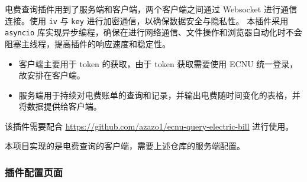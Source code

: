 \documentclass[14pt,a4paper,UTF8,twoside]{article}
\begin{document}
电费查询插件用到了服务端和客户端，两个客户端之间通过 Websocket 进行通信连接。使用 \verb`iv` 与 \verb`key` 进行加密通信，以确保数据安全与隐私性。
本插件采用 \texttt{asyncio} 库实现异步编程，确保在进行网络通信、文件操作和浏览器自动化时不会阻塞主线程，提高插件的响应速度和稳定性。

\begin{itemize}
    \item 客户端主要用于 token 的获取，由于 token 获取需要使用 ECNU 统一登录，故安排在客户端。
    \item 服务端用于持续对电费账单的查询和记录，并输出电费随时间变化的表格，并将数据提供给客户端。
\end{itemize}

\begin{note}
    该插件需要配合 \href{https://github.com/azazo1/ecnu-query-electric-bill}{\underline{https://github.com/azazo1/ecnu-query-electric-bill}} 进行使用。

    本项目实现的是电费查询的客户端，需要上述仓库的服务端配置。
\end{note}

\newpage{}

\subsubsection{插件配置页面}
\end{document}
